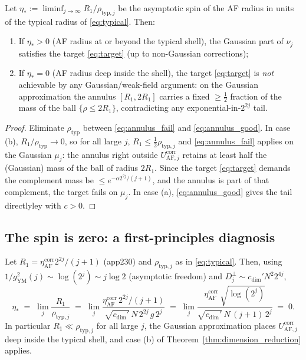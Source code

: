 \begin{theorem}
\label{thm:dimension_reduction}
Let $\eta_*:=\liminf_{j\to\infty} R_1/\rho_{\mathrm{typ},j}$ be the
asymptotic spin of the AF radius in units of the typical radius of
\eqref{eq:typical}. Then:
\begin{enumerate}
\item If $\eta_*>0$ (AF radius at or beyond the typical shell), the
Gaussian part of $\nu_j$ satisfies the target \eqref{eq:target} (up to
non-Gaussian corrections);
\item If $\eta_*=0$ (AF radius deep inside the shell), the target
\eqref{eq:target} is \emph{not} achievable by any Gaussian/weak-field
argument: on the Gaussian approximation the annulus
$[R_1,2R_1]$ carries a fixed $\ge\tfrac12$ fraction of the mass
of the ball $\{\rho\le 2R_1\}$, contradicting any exponential-in-$2^{2j}$
tail.
\end{enumerate}
\end{theorem}

\begin{proof}
Eliminate $\rho_{\mathrm{typ}}$ between \eqref{eq:annulus_fail} and
\eqref{eq:annulus_good}. In case (b), $R_1/\rho_{\mathrm{typ}}\to0$,
so for all large $j$, $R_1\le\tfrac12\rho_{\mathrm{typ},j}$ and
\eqref{eq:annulus_fail} applies on the Gaussian $\mu_j$: the annulus
right outside $U_{\mathrm{AF},j}^{\mathrm{corr}}$ retains at least half
the (Gaussian) mass of the ball of radius $2R_1$. Since the target
\eqref{eq:target} demands the complement mass be
$\le e^{-\alpha2^{2j}/(j+1)}$, and the annulus is part of that
complement, the target fails on $\mu_j$. In case (a),
\eqref{eq:annulus_good} gives the tail directlyley with $c>0$.
\end{proof}

\subsection{The spin is zero: a first-principles diagnosis}

\begin{theorem}
\label{thm:spin_zero}
Let $R_1=\eta_{\mathrm{AF}}^{\mathrm{corr}}2^{2j}/(j+1)$
(app230) and $\rho_{\mathrm{typ},j}$ as in \eqref{eq:typical}. Then,
using $1/g_{\mathrm{YM}}^2(j)\sim\log(2^j)\sim j\log2$ (asymptotic
freedom) and $D_j^\perp\sim c_{\dim}'N^2 2^{4j}$,
\begin{equation}
\label{eq:spin_formula}
  \eta_*\;=\;\lim_j \frac{R_1}{\rho_{\mathrm{typ},j}}
  \;=\;\lim_j
  \frac{\eta_{\mathrm{AF}}^{\mathrm{corr}}\,2^{2j}/(j+1)}
  {\sqrt{c_{\dim}'}\,N\,2^{2j}\,g\,2^{j}}
  \;=\;\lim_j
  \frac{\eta_{\mathrm{AF}}^{\mathrm{corr}}\,\sqrt{\log(2^j)}}{
  \sqrt{c_{\dim}'}\,N\,(j+1)\,2^{j}}
  \;=\;0.
\end{equation}
In particular $R_1\ll\rho_{\mathrm{typ},j}$ for all large $j$, the
Gaussian approximation places $U_{\mathrm{AF},j}^{\mathrm{corr}}$ deep
inside the typical shell, and case (b) of
Theorem~\ref{thm:dimension_reduction} applies.
\end{theorem}

